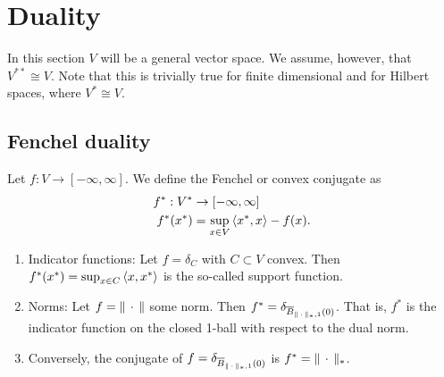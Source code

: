 \chapter{Duality}\label{chapter:duality}
In this section $V$ will be a general vector space. We assume, however, that $V^{**} \cong V$. Note that this is trivially true for finite dimensional and for Hilbert spaces, where $V^*\cong V$.

\section{Fenchel duality}

\begin{defn}
    Let $f:V\rightarrow [-\infty,\infty]$. We define the Fenchel or convex conjugate as
    \begin{equation}
        \begin{aligned}
            f^*:V^*&\rightarrow[-\infty,\infty]\\
            f^*(x^*) &= \sup_{x\in V} \left\langle x^* , x\right\rangle - f(x).
        \end{aligned}
    \end{equation}
\end{defn}

\begin{example}
    \begin{enumerate}
        \item Indicator functions: Let $f=\delta_C$ with $C\subset V$ convex. Then $f^*(x^*) = \sup_{x\in C}\left\langle x , x^*\right\rangle$ is the so-called support function.
        \item Norms: Let $f = \|\,\cdot\,\|$ some norm. Then $f^* = \delta_{\overline{B}_{\|\,\cdot\,\|_*,1}(0)}$. That is, $f^*$ is the indicator function on the closed 1-ball with respect to the dual norm.
        \item Conversely, the conjugate of $f = \delta_{\overline{B}_{\|\,\cdot\,\|_*,1}(0)}$ is $f^* = \|\,\cdot\,\|_*$.
    \end{enumerate}
\end{example}



